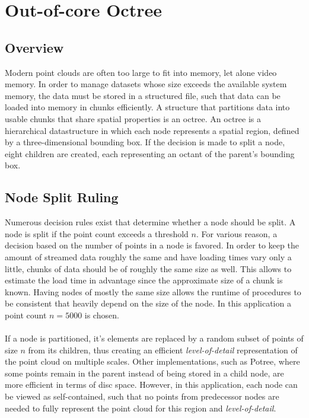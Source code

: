 \chapter{Out-of-core Octree}
\label{chap:octree}


\section{Overview}

Modern point clouds are often too large to fit into memory, let alone video memory. In order to manage datasets whose size exceeds the available system memory, the data must be stored in a structured file, such that data can be loaded into memory in chunks efficiently. A structure that partitions data into usable chunks that share spatial properties is an octree. 
An octree is a hierarchical datastructure in which each node represents a spatial region, defined by a three-dimensional bounding box. If the decision is made to split a node, eight children are created, each representing an octant of the parent's bounding box.


\section{Node Split Ruling}

Numerous decision rules exist that determine whether a node should be split. A node is split if the point count exceeds a threshold $n$.  For various reason, a decision based on the number of points in a node is favored. In order to keep the amount of streamed data roughly the same and have loading times vary only a little, chunks of data should be of roughly the same size as well. This allows to estimate the load time in advantage since the approximate size of a chunk is known. Having nodes of mostly the same size allows the runtime of procedures to be consistent that heavily depend on the size of the node.  In this application a point count $n = 5000$ is chosen. 
\\
\\
If a node is partitioned, it's elements are replaced by a random subset of points of size $n$ from its children, thus creating an efficient \textit{level-of-detail} representation of the point cloud on multiple scales. 
Other implementations, such as Potree\cite{SCHUETZ-2016-POT}, where some points remain in the parent instead of being stored in a child node, are more efficient in terms of disc space. However, in this application, each node can be viewed as self-contained, such that no points from predecessor nodes are needed to fully represent the point cloud for this region and \textit{level-of-detail}. 


